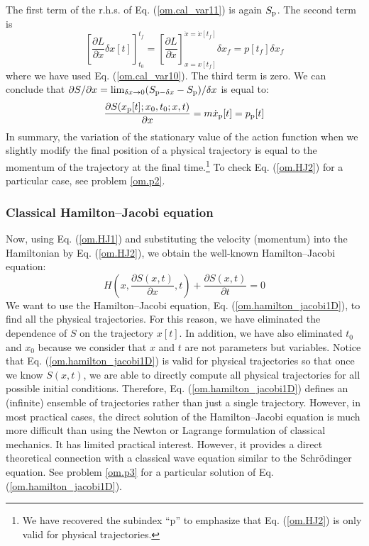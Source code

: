 \documentclass[nofootinbib, secnumarabic, amsmath, nobibnotes,10pt,aps,pra]{revtex4-1}
\newcommand{\eref}[1]{Eq. (\ref{#1})}
\begin{document}
\noindent The first term of the r.h.s. of \eref{om.cal_var11} is again $S_{\rm p}$. The second term is
\begin{equation}
\label{om.cal_var12}
\left[ \frac {\partial L} {\partial \dot{x}} \delta x[t] \right]_{t_0}^{t_f} = \left[ \frac {\partial L} {\partial \dot{x}} \right]_{x = x[t_f]}^{\dot{x} = \dot{x}[t_f]} \delta x_f = p[t_f] \delta x_f
\end{equation}
where we have used \eref{om.cal_var10}. The third term is zero. We can conclude that ${\partial S}/{\partial x} = \lim_{\delta x \rightarrow 0}(S_{{\rm p} - \delta x} - S_{\rm p})/\delta x$ is equal to:
\begin{equation}
\label{om.HJ2}
\frac{\partial S(x_{\rm p}[t];x_0,t_0;x,t)} {\partial x} = m \dot{x}_{\rm p}[t] = p_{\rm p}[t]
\end{equation}
In summary, the variation of the stationary value of the action
function when we slightly modify the final position of a physical
trajectory is equal to the momentum of the trajectory at the final
time.\footnote{We have recovered the subindex ``p'' to emphasize that
\eref{om.HJ2} is only valid for physical trajectories.} To check
\eref{om.HJ2} for a particular case, see problem \ref{om.p2}.


\subsubsection{Classical Hamilton--Jacobi equation}

Now, using \eref{om.HJ1} and substituting the velocity (momentum) into
the Hamiltonian by \eref{om.HJ2}, we  obtain the well-known
Hamilton--Jacobi equation:
\begin{equation}
\label{om.hamilton_jacobi1D}
H\left(x,\frac{\partial S(x,t)}{\partial x},t \right) + \frac{\partial S(x,t)}{\partial t} = 0
\end{equation}
We want to use the Hamilton--Jacobi equation,
\eref{om.hamilton_jacobi1D}, to find all the physical trajectories.
For this reason,  we have eliminated
the dependence of $S$ on the trajectory $x[t]$. In addition, we have
also eliminated $t_0$ and $x_0$ because we consider that $x$ and $t$
are not parameters but variables. Notice that
\eref{om.hamilton_jacobi1D} is valid for physical trajectories so
that once we know $S(x,t)$, we are able to directly compute all
physical trajectories for all possible initial conditions.
Therefore, \eref{om.hamilton_jacobi1D} defines an (infinite)
ensemble of trajectories rather than just a single trajectory.
However, in most practical cases, the direct solution of the
Hamilton--Jacobi equation is much more difficult than using the Newton or
Lagrange formulation of classical mechanics. It has limited
practical interest. However, it provides a direct theoretical
connection with a classical wave equation similar to the
Schr\"odinger equation. See problem \ref{om.p3} for a particular
solution of \eref{om.hamilton_jacobi1D}.
\end{document}
